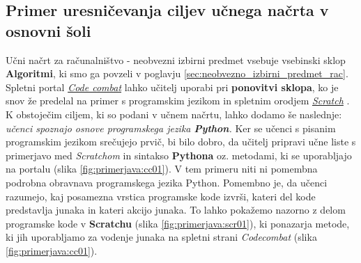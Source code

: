 \subsection{Primer uresničevanja ciljev učnega načrta v osnovni šoli}
\label{sec:uresn-cilj-unega-os}

Učni načrt za računalništvo - neobvezni izbirni predmet
\cite{ucni_nacrt-neobvezni-izbirni-os} vsebuje vsebinski sklop
\textbf{Algoritmi}, ki smo ga povzeli v poglavju
\ref{sec:neobvezno_izbirni_predmet_rac}. Spletni portal
\emph{\href{https://codecombat.com/}{Code combat}}
\cite{web:codecombat} lahko učitelj uporabi pri\textbf{ ponovitvi
  sklopa}, ko je snov že predelal na primer s programskim jezikom in
spletnim orodjem \emph{\href{https://scratch.mit.edu/}{Scratch}}
\cite{web:scratch}. K obstoječim ciljem, ki so podani v učnem načrtu,
lahko dodamo še naslednje: \emph{učenci spoznajo osnove programskega
  jezika \textbf{Python}.}  Ker se učenci s pisanim programskim
jezikom srečujejo prvič, bi bilo dobro, da učitelj pripravi učne liste
s primerjavo med \emph{Scratchom} in sintakso \textbf{Pythona}
oz. metodami, ki se uporabljajo na portalu (slika
\ref{fig:primerjava:cc01}). V tem primeru niti ni pomembna podrobna
obravnava programskega jezika Python. Pomembno je, da učenci razumejo,
kaj posamezna vrstica programske kode izvrši, kateri del kode
predstavlja junaka in kateri akcijo junaka. To lahko pokažemo nazorno
z delom programske kode v \textbf{Scratchu} (slika
\ref{fig:primerjava:scr01}), ki ponazarja metode, ki jih uporabljamo
za vodenje junaka na spletni strani \emph{Codecombat} (slika
\ref{fig:primerjava:cc01}).

